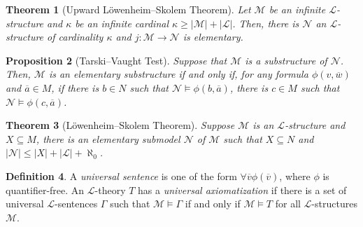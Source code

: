 \documentclass{amsart}
\newtheorem{theorem}{Theorem}[subsection]
\newtheorem{lemma}[theorem]{Lemma}
\newtheorem{proposition}[theorem]{Proposition}
\theoremstyle{definition}
\newtheorem{definition}[theorem]{Definition}
\numberwithin{equation}{section}
\begin{document}
\begin{theorem}[Upward L\"owenheim--Skolem Theorem]
  Let $\mathcal{M}$ be an infinite $\mathcal{L}$-structure and
  $\kappa$ be an infinite cardinal $\kappa \ge |\mathcal{M}| + |\mathcal{L}|$.
  Then, there is $\mathcal{N}$ an $\mathcal{L}$-structure of cardinality $\kappa$ and $j: \mathcal{M} \to \mathcal{N}$ is elementary.
\end{theorem}

\begin{proposition}[Tarski--Vaught Test]
  Suppose that $\mathcal{M}$ is a substructure of $\mathcal{N}$.
  Then, $\mathcal{M}$ is an elementary substructure if and only if,
  for any formula $\phi(v,\overline{w})$ and $\overline{a} \in M$,
  if there is $b \in N$ such that $\mathcal{N} \models \phi(b,\overline{a})$,
  there is $c \in M$ such that $\mathcal{N} \models \phi(c,\overline{a})$.
\end{proposition}




\begin{theorem}[L\"owenheim--Skolem Theorem]
  Suppose $\mathcal{M}$ is an $\mathcal{L}$-structure and
  $X \subseteq M$, there is an elementary submodel $\mathcal{N}$ of $\mathcal{M}$
  such that $X \subseteq N$ and $|\mathcal{N}| \le |X| + |\mathcal{L}| + \aleph_0$.
\end{theorem}

\begin{definition}
  A \emph{universal sentence} is one of the form
  $\forall \overline{v} \phi(\overline{v})$,
  where $\phi$ is quantifier-free.
  An $\mathcal{L}$-theory $T$ has a \emph{universal axiomatization} if there is a set of universal $\mathcal{L}$-sentences $\Gamma$
  such that $\mathcal{M} \models \Gamma$ if and only if $\mathcal{M} \models T$ for all $\mathcal{L}$-structures $\mathcal{M}$.
\end{definition}
\end{document}
